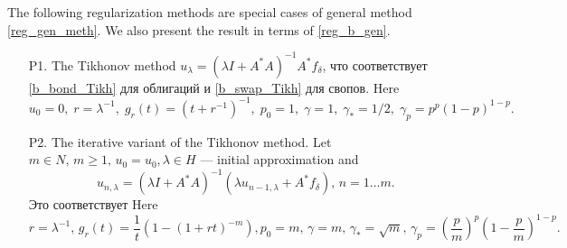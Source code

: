 \documentclass[10pt]{article}
\theoremstyle{definition}
\theoremstyle{remark}
\theoremstyle{plain}
\newcommand{\wt}{\widetilde}
\begin{document}
The following regularization methods are special cases of general method \eqref{reg_gen_meth}. We also present the result in terms of \eqref{reg_b_gen}.
\begin{itemize}
\item[P1.] %
The Tikhonov method $u_\lambda = \left(\lambda I + A^*A\right)^{-1}A^*f_\delta$, что соответствует \eqref{b_bond_Tikh} для облигаций и \eqref{b_swap_Tikh} для свопов. Here
$$
u_0 = 0, \; 
r=\lambda^{-1}, \; 
g_r(t) = \left(t+r^{-1}\right)^{-1}, \; 
p_0=1, \;
\gamma = 1, \;
\gamma_* = 1/2, \;
\gamma_p = p^p(1-p)^{1-p}.
$$

\item[P2.] 
The iterative variant of the Tikhonov method. Let $m\in N,\,m\geqslant 1,\, u_0=u_0,\lambda \in H$ --- initial approximation and 
$$
u_{n,\lambda} = 
	\left(\lambda I + A^*A\right)^{-1} 
	\left(\lambda u_{n-1,\lambda}+ A^*f_\delta\right),
\,
n = 1\ldots m.
$$
Это соответствует  
Here
$$
r=\lambda^{-1}, \, 
g_r(t) = \frac{1}{t}\left(1-(1+rt)^{-m}\right),
p_0=m, \,
\gamma = m, \,
\gamma_* = \sqrt{m}, \,
\gamma_p = \left(\frac{p}{m}\right)^p\left(1-\frac{p}{m}\right)^{1-p}.
$$


\end{itemize}
\end{document}

